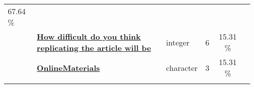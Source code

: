 \documentclass[]{article}
\begin{document}
\begin{longtable}[]{@{}lllrcl@{}}
\begin{minipage}[t]{0.10\columnwidth}
67.64 \%\strut
\end{minipage} & \begin{minipage}[t]{0.12\columnwidth}\raggedright\strut
\strut
\end{minipage}\tabularnewline
\begin{minipage}[t]{0.07\columnwidth}\raggedright\strut
\strut
\end{minipage} & \begin{minipage}[t]{0.35\columnwidth}\raggedright\strut
\textbf{\protect\hyperlink{how-difficult-do-you-think-replicating-the-article-will-be}{How
difficult do you think replicating the article will be}}\strut
\end{minipage} & \begin{minipage}[t]{0.11\columnwidth}\raggedright\strut
integer\strut
\end{minipage} & \begin{minipage}[t]{0.10\columnwidth}\raggedleft\strut
6\strut
\end{minipage} & \begin{minipage}[t]{0.10\columnwidth}\centering\strut
15.31 \%\strut
\end{minipage} & \begin{minipage}[t]{0.12\columnwidth}\raggedright\strut
\strut
\end{minipage}\tabularnewline
\begin{minipage}[t]{0.07\columnwidth}\raggedright\strut
\strut
\end{minipage} & \begin{minipage}[t]{0.35\columnwidth}\raggedright\strut
\textbf{\protect\hyperlink{onlinematerials}{OnlineMaterials}}\strut
\end{minipage} & \begin{minipage}[t]{0.11\columnwidth}\raggedright\strut
character\strut
\end{minipage} & \begin{minipage}[t]{0.10\columnwidth}\raggedleft\strut
3\strut
\end{minipage} & \begin{minipage}[t]{0.10\columnwidth}\centering\strut
15.31 \%\strut
\end{minipage} & \begin{minipage}[t]{0.12\columnwidth}\raggedright\strut
\strut
\end{minipage}\tabularnewline
\begin{minipage}[t]{0.07\columnwidth}\raggedright\strut
\strut
\end{minipage} & \begin{minipage}[t]{0.35\columnwidth}\raggedright\strut

\end{minipage}
\end{longtable}
\end{document}
